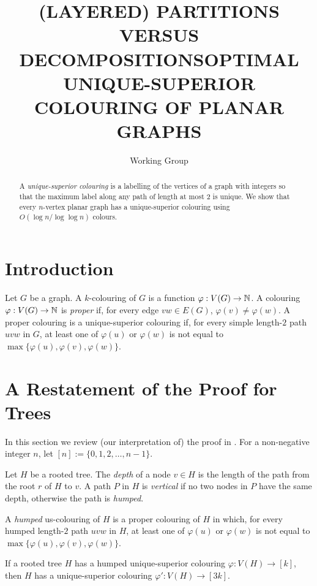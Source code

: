 \documentclass[kpfonts]{patmorin}
\title{\MakeUppercase{(Layered) Partitions versus Decompositions}}
\author{}
\title{\MakeUppercase{Optimal Unique-Superior Colouring of Planar Graphs}}
\author{Working Group}
\begin{document}
\maketitle

\begin{abstract}
  A \emph{unique-superior colouring} is a labelling of the vertices of a graph with integers so that the maximum label along any path of length at most 2 is unique.  We show that every $n$-vertex planar graph has a unique-superior colouring using $O(\log n/\log\log n)$ colours.
\end{abstract}



\section{Introduction}

Let $G$ be a graph.  A $k$-colouring of $G$ is a function $\varphi:V(G)\to\mathbb{N}$.  A colouring $\varphi:V(G)\to\mathbb{N}$ is \emph{proper} if, for every edge $vw\in E(G)$, $\varphi(v)\neq\varphi(w)$.  A proper colouring is a unique-superior colouring if, for every simple length-$2$ path $uvw$ in $G$, at least one of $\varphi(u)$ or $\varphi(w)$ is not equal to $\max\{\varphi(u),\varphi(v),\varphi(w)\}$.

\section{A Restatement of the Proof for Trees}

In this section we review (our interpretation of) the proof in \cite{X}.
For a non-negative integer $n$, let $[n]:=\{0,1,2,\ldots,n-1\}$.

Let $H$ be a rooted tree.  The \emph{depth} of a node $v\in H$ is the length of the path from the root $r$ of $H$ to $v$.  A path $P$ in $H$ is \emph{vertical} if no two nodes in $P$ have the same depth, otherwise the path is \emph{humped}.

A \emph{humped} us-colouring of $H$ is a proper colouring of $H$ in which, for every humped length-$2$ path $uvw$ in $H$, at least one of $\varphi(u)$ or $\varphi(w)$ is not equal to $\max\{\varphi(u),\varphi(v),\varphi(w)\}$.

\begin{lem}\label{product}
    If a rooted tree $H$ has a humped unique-superior colouring $\varphi:V(H)\to [k]$, then $H$ has a unique-superior colouring $\varphi':V(H)\to[3k]$.
\end{lem}
\end{document}
